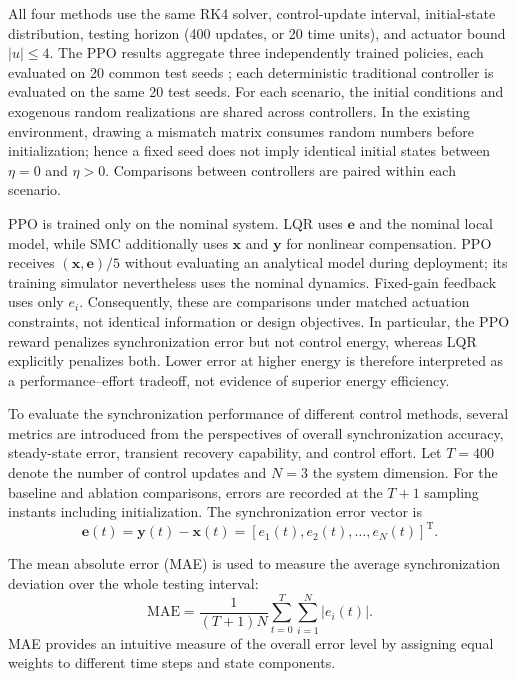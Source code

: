 \documentclass[a4paper,fleqn]{cas-dc}
\theoremstyle{plain}
\theoremstyle{definition}
\begin{document}
All four methods use the same RK4 solver, control-update interval, initial-state distribution, testing horizon (400 updates, or 20 time units), and actuator bound $|u|\leq4$. The PPO results aggregate three independently trained policies, each evaluated on 20 common test seeds ; each deterministic traditional controller is evaluated on the same 20 test seeds. For each scenario, the initial conditions and exogenous random realizations are shared across controllers. In the existing environment, drawing a mismatch matrix consumes random numbers before initialization; hence a fixed seed does not imply identical initial states between $\eta=0$ and $\eta>0$. Comparisons between controllers are paired within each scenario.

PPO is trained only on the nominal system. LQR uses $\mathbf e$ and the nominal local model, while SMC additionally uses $\mathbf x$ and $\mathbf y$ for nonlinear compensation. PPO receives $(\mathbf x,\mathbf e)/5$ without evaluating an analytical model during deployment; its training simulator nevertheless uses the nominal dynamics. Fixed-gain feedback uses only $e_i$. Consequently, these are comparisons under matched actuation constraints, not identical information or design objectives. In particular, the PPO reward penalizes synchronization error but not control energy, whereas LQR explicitly penalizes both. Lower error at higher energy is therefore interpreted as a performance--effort tradeoff, not evidence of superior energy efficiency.

To evaluate the synchronization performance of different control methods, several metrics are introduced from the perspectives of overall synchronization accuracy, steady-state error, transient recovery capability, and control effort. Let $T=400$ denote the number of control updates and $N=3$ the system dimension. For the baseline and ablation comparisons, errors are recorded at the $T+1$ sampling instants including initialization. The synchronization error vector is
\begin{equation}
	\mathbf{e}(t)=\mathbf{y}(t)-\mathbf{x}(t)
	=
	[e_1(t),e_2(t),\ldots,e_N(t)]^{\mathrm T}.
	\label{eq:error_vector_metrics}
\end{equation}

The mean absolute error (MAE) is used to measure the average synchronization deviation over the whole testing interval:
\begin{equation}
	\mathrm{MAE}
	=
	\frac{1}{(T+1)N}
	\sum_{t=0}^{T}
	\sum_{i=1}^{N}
	|e_i(t)|.
	\label{eq:mae}
\end{equation}
MAE provides an intuitive measure of the overall error level by assigning equal weights to different time steps and state components.
\end{document}
